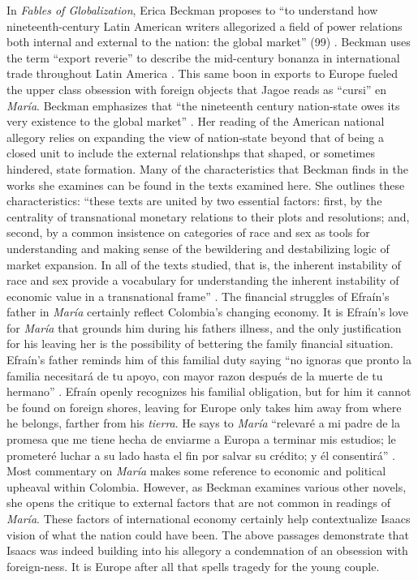 \documentclass[12pt]{report}\usepackage[]{graphicx}\usepackage[]{color}
\begin{document}
\begin{spacing}{1.9}
In \textit{Fables of Globalization}, Erica Beckman proposes to \enquote{to understand how nineteenth-century Latin American writers allegorized a field of power relations both internal and external to the nation: the global market} (99) \nocite{Beckman2013}. 
Beckman uses the term \enquote{export reverie} to describe the mid-century bonanza in international trade throughout Latin America \autocite[x]{Beckman2012}.
This same boon in exports to Europe fueled the upper class obsession with foreign objects that Jagoe reads as \enquote{cursi} en \textit{María}.
Beckman emphasizes that \enquote{the nineteenth century nation-state owes its very existence to the global market} \autocite[100]{Beckman2013}.
Her reading of the American national allegory relies on expanding the view of nation-state beyond that of being a closed unit to include the external relationshps that shaped, or sometimes hindered, state formation.
Many of the characteristics that Beckman finds in the works she examines can be found in the texts examined here.
She outlines these characteristics: \enquote{these texts are united by two essential factors: first, by the centrality of transnational monetary relations to their plots and resolutions; and, second, by a common insistence on categories of race and sex as tools for understanding and making sense of the bewildering and destabilizing logic of market expansion. In all of the texts studied, that is, the inherent instability of race and sex provide a vocabulary for understanding the inherent instability of economic value in a transnational frame} \autocite[101]{Beckman2013}.
The financial struggles of Efraín's father in \textit{María} certainly reflect Colombia's changing economy.
It is Efraín's love for \textit{María} that grounds him during his fathers illness, and the only justification for his leaving her is the possibility of bettering the family financial situation.
Efraín's father reminds him of this familial duty saying \enquote{no ignoras que pronto la familia necesitará de tu apoyo, con mayor razon después de la muerte de tu hermano} \autocite[??]{Isaacs2012}.
Efraín openly recognizes his familial obligation, but for him it cannot be found on foreign shores, leaving for Europe only takes him away from where he belongs, farther from his \textit{tierra}.
He says to \textit{María} \enquote{relevaré a mi padre de la promesa que me tiene hecha de enviarme a Europa a terminar mis estudios; le prometeré luchar a su lado hasta el fin por salvar su crédito; y él consentirá} \autocite[]{Isaacs2012}.
Most commentary on \textit{María} makes some reference to economic and political upheaval within Colombia.
However, as Beckman examines various other novels, she opens the critique to external factors that are not common in readings of \textit{María}.
These factors of international economy certainly help contextualize Isaacs vision of what the nation could have been.
The above passages demonstrate that Isaacs was indeed building into his allegory a condemnation of an obsession with foreign-ness.
It is Europe after all that spells tragedy for the young couple.


\end{spacing}
\end{document}
